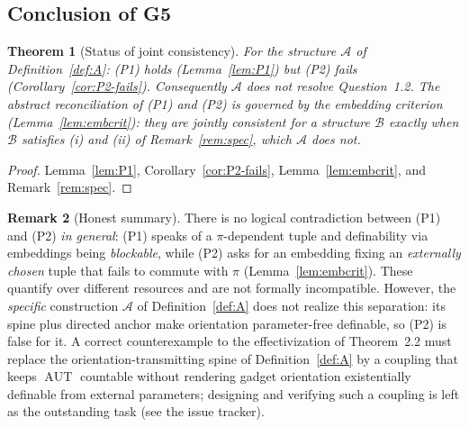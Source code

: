 \documentclass[12pt,fullpage]{article}
\newtheorem{theorem}{Theorem}[section]
\theoremstyle{definition}
\newtheorem{remark}[theorem]{Remark}
\newcommand{\A}{\mathcal{A}}
\newcommand{\B}{\mathcal{B}}
\newcommand{\AUT}{\operatorname{AUT}}
\begin{document}
\subsection*{Conclusion of G5}

\begin{theorem}[Status of joint consistency]\label{thm:G5}
For the structure $\A$ of Definition~\ref{def:A}: (P1) holds
(Lemma~\ref{lem:P1}) but (P2) \emph{fails} (Corollary~\ref{cor:P2-fails}).
Consequently $\A$ does not resolve Question~1.2.  The abstract reconciliation
of (P1) and (P2) is governed by the embedding criterion
(Lemma~\ref{lem:embcrit}): they are jointly consistent for a structure $\B$
exactly when $\B$ satisfies (i) and (ii) of Remark~\ref{rem:spec}, which $\A$
does not.
\end{theorem}

\begin{proof}
Lemma~\ref{lem:P1}, Corollary~\ref{cor:P2-fails}, Lemma~\ref{lem:embcrit}, and
Remark~\ref{rem:spec}.
\end{proof}

\begin{remark}[Honest summary]
There is no logical contradiction between (P1) and (P2) \emph{in general}:
(P1) speaks of a $\pi$-dependent tuple and definability via embeddings being
\emph{blockable}, while (P2) asks for an embedding fixing an
\emph{externally chosen} tuple that fails to commute with $\pi$
(Lemma~\ref{lem:embcrit}).  These quantify over different resources and are
not formally incompatible.  However, the \emph{specific} construction $\A$ of
Definition~\ref{def:A} does not realize this separation: its spine plus
directed anchor make orientation parameter-free definable, so (P2) is false
for it.  A correct counterexample to the effectivization of Theorem~2.2 must
replace the orientation-transmitting spine of Definition~\ref{def:A} by a
coupling that keeps $\AUT$ countable without rendering gadget orientation
existentially definable from external parameters; designing and verifying such
a coupling is left as the outstanding task (see the issue tracker).
\end{remark}
\end{document}
